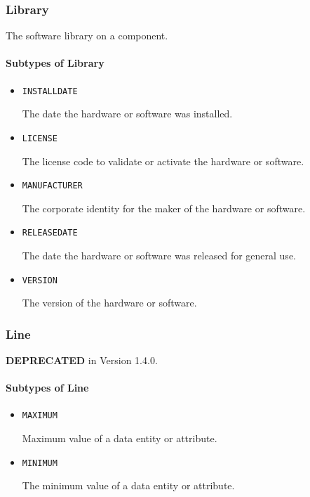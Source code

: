 \subsubsection{Library}
\label{sec:Library}



The software library on a component.



\paragraph{Subtypes of Library}\mbox{}
\label{sec:Subtypes of Library}

\begin{itemize}

\item \texttt{INSTALL\textunderscore DATE}


The date the hardware or software was installed.

\item \texttt{LICENSE}


The license code to validate or activate the hardware or software.

\item \texttt{MANUFACTURER}


The corporate identity for the maker of the hardware or software.


\item \texttt{RELEASE\textunderscore DATE}


The date the hardware or software was released for general use.


\item \texttt{VERSION}


The version of the hardware or software.


\end{itemize}

\subsubsection{Line}
\label{sec:Line}



\textbf{DEPRECATED} in Version 1.4.0.


\paragraph{Subtypes of Line}\mbox{}
\label{sec:Subtypes of Line}

\begin{itemize}

\item \texttt{MAXIMUM}


Maximum value of a data entity or attribute.

\item \texttt{MINIMUM}


The minimum value of a data entity or attribute.


\end{itemize}

